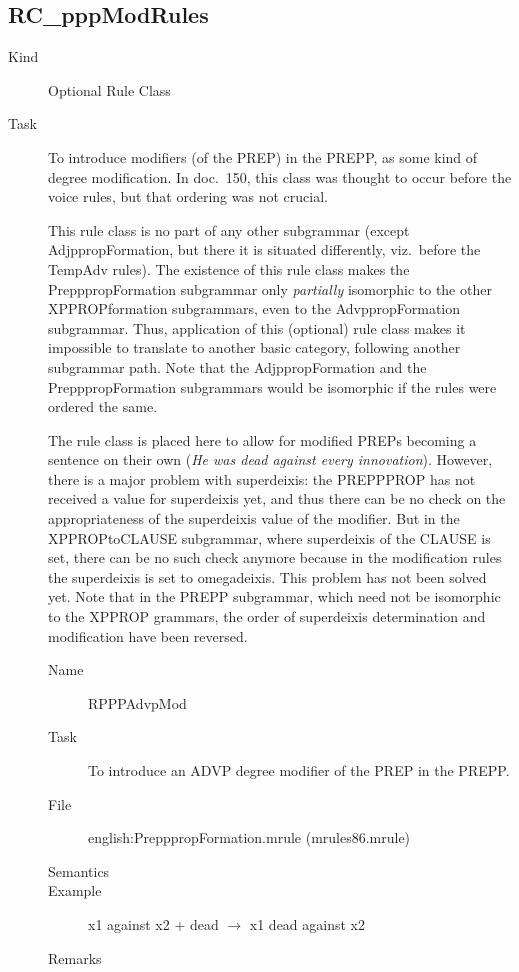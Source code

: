\subsection{RC\_pppModRules}
\begin{description}
\item[Kind] Optional Rule Class
\item[Task] To introduce modifiers (of the PREP) in the PREPP, as some kind of 
degree modification. In doc.\ 150, this class was thought to occur before the 
voice rules, but that ordering was not crucial.

This rule class is no part of any other subgrammar (except 
AdjppropFormation, but there it is situated differently, viz.\ before the 
TempAdv rules). The existence of 
this rule class makes the PrepppropFormation subgrammar only {\em partially\/} 
isomorphic to the other XPPROPformation subgrammars, even to the 
AdvppropFormation subgrammar.
Thus, application of this (optional) rule class makes it impossible to translate 
to another basic category, following another subgrammar path. Note that the
AdjppropFormation and the PrepppropFormation subgrammars would be isomorphic if 
the rules were ordered the same.

The rule class is placed here to allow for modified PREPs becoming a sentence 
on their own ({\em He was dead against every innovation\/}). However, there is 
a major problem with superdeixis: the PREPPPROP has not received a value for 
superdeixis yet, and thus there can be no check on the appropriateness of the 
superdeixis value of the modifier. But in the XPPROPtoCLAUSE subgrammar, where 
superdeixis of the CLAUSE is set, there can be no such check anymore because 
in the modification rules the superdeixis is set to omegadeixis. This problem 
has not been solved yet. Note that in the PREPP subgrammar, which need not be 
isomorphic to the XPPROP grammars, the order of superdeixis determination and 
modification have been reversed.

\vspace{1 cm}
\begin{description}
\item[Name] RPPPAdvpMod
\item[Task] To introduce an ADVP degree modifier of the PREP in the PREPP.
\item[File] english:PrepppropFormation.mrule (mrules86.mrule)
\item[Semantics]
\item[Example] x1 against x2 + dead $\rightarrow$ x1 dead against x2
\item[Remarks]
\end{description}


\end{description}
